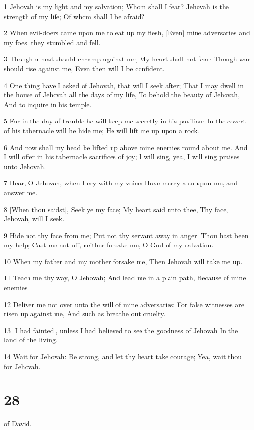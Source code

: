 \par 1 Jehovah is my light and my salvation; Whom shall I fear? Jehovah is the strength of my life; Of whom shall I be afraid?
\par 2 When evil-doers came upon me to eat up my flesh, [Even] mine adversaries and my foes, they stumbled and fell.
\par 3 Though a host should encamp against me, My heart shall not fear: Though war should rise against me, Even then will I be confident.
\par 4 One thing have I asked of Jehovah, that will I seek after; That I may dwell in the house of Jehovah all the days of my life, To behold the beauty of Jehovah, And to inquire in his temple.
\par 5 For in the day of trouble he will keep me secretly in his pavilion: In the covert of his tabernacle will he hide me; He will lift me up upon a rock.
\par 6 And now shall my head be lifted up above mine enemies round about me. And I will offer in his tabernacle sacrifices of joy; I will sing, yea, I will sing praises unto Jehovah.
\par 7 Hear, O Jehovah, when I cry with my voice: Have mercy also upon me, and answer me.
\par 8 [When thou saidst], Seek ye my face; My heart said unto thee, Thy face, Jehovah, will I seek.
\par 9 Hide not thy face from me; Put not thy servant away in anger: Thou hast been my help; Cast me not off, neither forsake me, O God of my salvation.
\par 10 When my father and my mother forsake me, Then Jehovah will take me up.
\par 11 Teach me thy way, O Jehovah; And lead me in a plain path, Because of mine enemies.
\par 12 Deliver me not over unto the will of mine adversaries: For false witnesses are risen up against me, And such as breathe out cruelty.
\par 13 [I had fainted], unless I had believed to see the goodness of Jehovah In the land of the living.
\par 14 Wait for Jehovah: Be strong, and let thy heart take courage; Yea, wait thou for Jehovah.

\chapter{28}

\par [A Psalm] of David.

